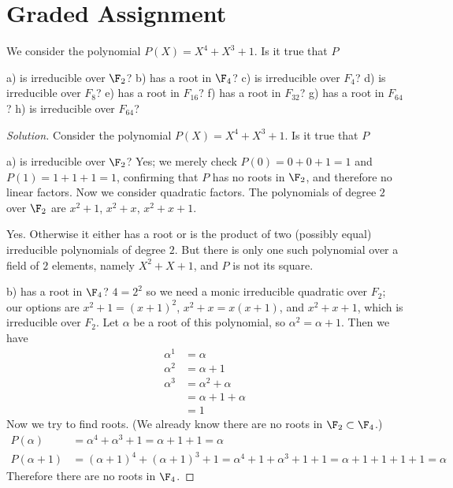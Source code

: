 \section{Graded Assignment}

\begin{que}
We consider the polynomial $P(X)=X^4 + X^3 + 1$. Is it true that $P$

a) is irreducible over $\F_2$? 
b) has a root in $\F_4$? 
c) is irreducible over $F_4$? 
d) is irreducible over $F_8$? 
e) has a root in $F_16$? 
f) has a root in $F_32$? 
g) has a root in $F_64$? 
h) is irreducible over $F_64$?
\end{que}
\begin{proof}[Solution]
Consider the polynomial $P(X) = X^4 + X^3 + 1$. Is it true that $P$

a) is irreducible over $\F_2$?
Yes; we merely check $P(0) = 0 + 0 + 1 = 1$ and $P(1) = 1 + 1 + 1 = 1$, confirming that $P$ has no roots in $\F_2$, and therefore no linear factors. Now we consider quadratic factors. The polynomials of degree $2$ over $\F_2$ are $x^2 + 1$, $x^2 + x$, $x^2 + x + 1$.

{\color{blue} Yes. Otherwise it either has a root or is the product of two (possibly equal) irreducible polynomials of degree $2$. But there is only one such polynomial over a field of $2$ elements, namely $X^2 + X + 1$, and $P$ is not its square.}

b) has a root in $\F_4$?
$4 = 2^2$ so we need a monic irreducible quadratic over $F_2$; our options are $x^2 + 1 = (x + 1)^2$, $x^2 + x = x(x + 1)$, and $x^2 + x + 1$, which is irreducible over $F_2$. Let $\alpha$ be a root of this polynomial, so $\alpha^2 = \alpha + 1$. Then we have 
\begin{align*}
\alpha^1 &= \alpha\\
\alpha^2 &= \alpha + 1\\
\alpha^3 &= \alpha^2 + \alpha\\
         &= \alpha + 1 + \alpha\\
         &= 1
\end{align*}
Now we try to find roots. (We already know there are no roots in $\F_2 \subset \F_4$.)
\begin{align*}
P(\alpha)   &= \alpha^4 + \alpha^3 + 1 = \alpha + 1 + 1 = \alpha\\
P(\alpha + 1) &= (\alpha + 1)^4 + (\alpha + 1)^3 + 1 = \alpha^4 + 1 + \alpha^3 + 1 + 1 = \alpha + 1 + 1 + 1 + 1 = \alpha
\end{align*}
Therefore there are no roots in $\F_4$.


\end{proof}
